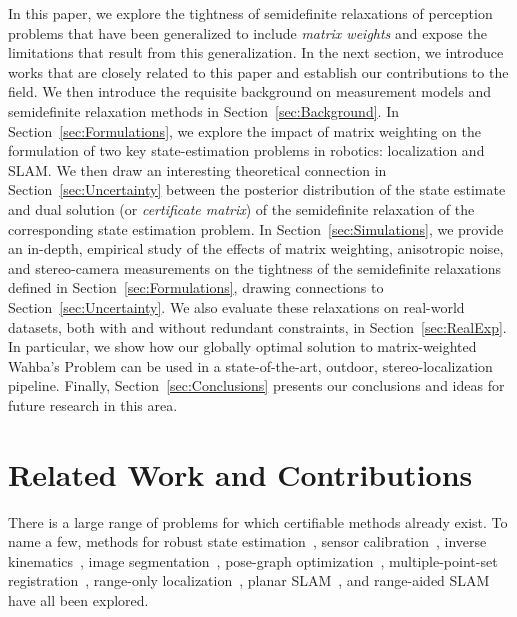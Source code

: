 \documentclass[lettersize,journal]{IEEEtran}
\begin{document}
In this paper, we explore the tightness of semidefinite relaxations of perception problems that have been generalized to include \emph{matrix weights} and expose the limitations that result from this generalization. In the next section, we introduce works that are closely related to this paper and establish our contributions to the field.  We then introduce the requisite background on measurement models and semidefinite relaxation methods in Section~\ref{sec:Background}. 
In Section~\ref{sec:Formulations}, we explore the impact of matrix weighting on the formulation of two key state-estimation problems in robotics: localization and SLAM.
We then draw an interesting theoretical connection in Section~\ref{sec:Uncertainty} between the posterior distribution of the state estimate and dual solution (or \emph{certificate matrix}) of the semidefinite relaxation of the corresponding state estimation problem. 
In Section~\ref{sec:Simulations}, we provide an in-depth, empirical study of the effects of matrix weighting, anisotropic noise, and stereo-camera measurements on the tightness of the semidefinite relaxations defined in  Section~\ref{sec:Formulations}, drawing connections to Section~\ref{sec:Uncertainty}. We also evaluate these relaxations on real-world datasets, both with and without redundant constraints, in Section~\ref{sec:RealExp}. In particular, we show how our globally optimal solution to matrix-weighted Wahba's Problem can be used in a state-of-the-art, outdoor, stereo-localization pipeline.  Finally, Section~\ref{sec:Conclusions} presents our conclusions and ideas for future research in this area.

\section{Related Work and Contributions}\label{sec:RelatedContrib}

There is a large range of problems for which certifiable methods already exist. To name a few, methods for robust state estimation~\cite{yangCertifiablyOptimalOutlierRobust2023,yangTEASERFastCertifiable2021}, sensor calibration~\cite{wiseCertifiablyOptimalMonocular2020,giamouConvexIterationDistanceGeometric2022}, inverse kinematics~\cite{giamouConvexIterationDistanceGeometric2022}, image segmentation~\cite{huAcceleratedInferenceMarkov2019}, pose-graph optimization~\cite{rosenSESyncCertifiablyCorrect2019}, multiple-point-set registration~\cite{chaudhuryGlobalRegistrationMultiple2015, iglesiasGlobalOptimalityPoint2020}, range-only localization~\cite{dumbgenSafeSmoothCertified2023}, planar SLAM~\cite{liuConvexOptimizationBased2012}, and range-aided SLAM~\cite{papaliaCertifiablyCorrectRangeAided2023} have all been explored. 
\end{document}
